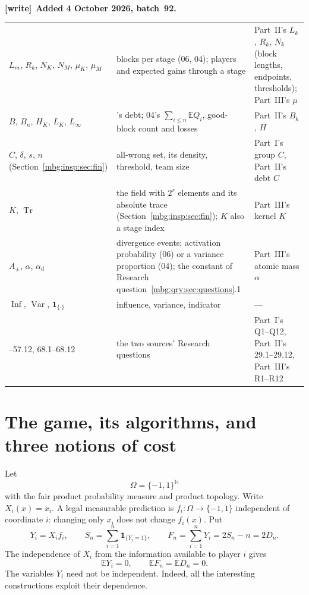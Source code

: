 \documentclass[11pt,letterpaper]{article}
\theoremstyle{definition}
\newcommand{\N}{\mathbb N}
\newcommand{\E}{\mathbb E}
\newcommand{\ind}{\mathbf 1}
\newcommand{\indic}[1]{\mathbf 1_{\{#1\}}}
\DeclareMathOperator{\Var}{Var}
\DeclareMathOperator{\Inf}{Inf}
\newenvironment{writenote}[1][]{\par\smallskip\begingroup\small
 \noindent\textbf{[write]}\if\relax\detokenize{#1}\relax\else~\textbf{#1.}\fi\ }%
 {\par\endgroup\smallskip}
\begin{document}
\begin{writenote}[Added 4 October 2026, batch~92]
\begin{longtable}{>{\raggedright\arraybackslash}p{}>{\raggedright\arraybackslash}p{}>{\raggedright\arraybackslash}p{}}
$L_m$, $R_k$, $N_K$, $N_M$, $\mu_K$, $\mu_M$ & blocks per stage (06, 04); players and expected gains through a stage & Part~II's $L_k$, $R_k$, $N_k$ (block lengths, endpoints, thresholds); Part~III's $\mu$\\
$B$, $B_n$, $H_K$, $L_K$, $L_\infty$ & 06's debt; 04's $\sum_{i\le n}\E Q_i$, good-block count and losses & Part~II's $B_k$, $H$\\
$C$, $\delta$, $s$, $n$ (Section~\ref{mbg:insp:sec:fin}) & all-wrong set, its density, threshold, team size & Part~I's group $C$, Part~II's debt $C$\\
$K$, $\operatorname{Tr}$ & the field with $2^r$ elements and its absolute trace (Section~\ref{mbg:insp:sec:fin}); $K$ also a stage index & Part~III's kernel $K$\\
$A_\pm$, $\alpha$, $\alpha_d$ & divergence events; activation probability (06) or a variance proportion (04); the constant of Research question~\ref{mbg:qry:sec:questions}.1 & Part~III's atomic mass $\alpha$\\
$\Inf$, $\Var$, $\indic{\cdot}$ & influence, variance, indicator & ---\\
57.1--57.12, 68.1--68.12 & the two sources' Research questions & Part~I's Q1--Q12, Part~II's 29.1--29.12, Part~III's R1--R12\\
\bottomrule
\end{longtable}
\end{writenote}

\section{The game, its algorithms, and three notions of cost}
\label{mbg:qry:sec:model}

Let
\[
 \Omega=\{-1,1\}^{\N}
\]
with the fair product probability measure and product topology.
Write \(X_i(x)=x_i\). A legal measurable prediction is
\(f_i:\Omega\to\{-1,1\}\) independent of coordinate \(i\):
changing only \(x_i\) does not change \(f_i(x)\).
Put
\begin{equation}
 Y_i=X_if_i,\qquad
 S_n=\sum_{i=1}^n\ind_{\{Y_i=1\}},\qquad
 F_n=\sum_{i=1}^nY_i=2S_n-n=2D_n.
 \label{mbg:qry:eq:score}
\end{equation}
The independence of \(X_i\) from the information available to player \(i\)
gives
\begin{equation}
 \E Y_i=0,\qquad \E F_n=\E D_n=0.
 \label{mbg:qry:eq:fairness}
\end{equation}
The variables \(Y_i\) need not be independent. Indeed, all the interesting
constructions exploit their dependence.
\end{document}
